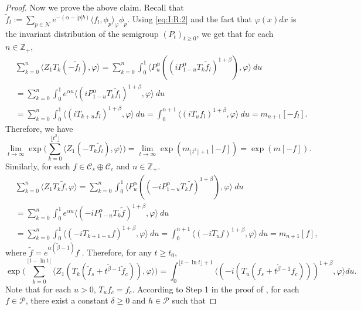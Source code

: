 \documentclass[12pt,a4paper]{amsart}
\theoremstyle{plain}
\theoremstyle{definition}
\numberwithin{equation}{section}
\begin{document}
\begin{proof}
Now we prove the above claim.
 Recall that  $\tilde f_l := \sum_{p\in \mathcal N} e^{-(\alpha - |p|b)}\langle f_l, \phi_p \rangle_\varphi \phi_p$.
  Using \eqref{eq:I:R:2} and the fact that $\varphi(x)dx$ is the invariant distribution of the semigroup $(P_t)_{t\geq 0}$, we get that for each $n\in \mathbb Z_+$,
  \begin{align}
    \label{eq:PM:CLTS:2a}
    & \sum_{k=0}^n \langle Z_1 T_{k} (-\tilde f_l), \varphi \rangle
      = \sum_{k=0}^n \int_0^1 \langle P_u^\alpha ((iP_{1 - u}^\alpha T_k \tilde f_l)^{1+\beta}), \varphi\rangle ~du
    \\& = \sum_{k=0}^n \int_0^1 e^{\alpha u} \langle  (iP_{1 - u}^\alpha T_{k}\tilde f_l)^{1+\beta}, \varphi \rangle ~du
    \\& = \sum_{k=0}^n \int_0^1 \langle  (iT_{k+ u} f_l)^{1+\beta}, \varphi\rangle~du
    = \int_0^{n+1} \langle  (iT_{u} f_l)^{1+\beta}, \varphi\rangle~du = m_{n+1}[-f_l].
  \end{align}
Therefore, we have
\[
\lim_{t\rightarrow \infty}\exp\Big(\sum_{k=0}^{\lfloor t^2 \rfloor}\langle Z_1(-T_k\tilde{f}_l),\varphi\rangle\Big) = \lim_{t\rightarrow \infty}\exp(m_{\lfloor t^2 \rfloor+1}[-f])=\exp(m[-f]).
\]
Similarly, for each $f\in \mathcal C_s  \oplus \mathcal C_c$ and $n\in \mathbb Z_+$.
  \begin{align}
    & \sum_{k=0}^n \langle Z_1 T_{k} \tilde f, \varphi \rangle
    = \sum_{k=0}^n \int_0^1 \langle P_u^\alpha ((-iP_{1 - u}^\alpha T_k \tilde f)^{1+\beta}), \varphi\rangle ~du
    \\& = \sum_{k=0}^n \int_0^1 e^{\alpha u} \langle  (-iP_{1 - u}^\alpha T_{k}\tilde f)^{1+\beta}, \varphi \rangle ~du
    \\& = \sum_{k=0}^n \int_0^1 \langle  (-iT_{k+1 - u} f)^{1+\beta}, \varphi\rangle~du
    = \int_0^{n+1} \langle  (-iT_{u} f)^{1+\beta}, \varphi\rangle~du = m_{n+1}[f],
  \end{align}
where $\tilde f=e^{\alpha(\tilde \beta - 1)} f$ .
Therefore, for any $t\geq t_0$,
\[
\exp\Big(\sum_{k=0}^{\lfloor t-\ln t \rfloor} \langle Z_1(T_{k}(\tilde f_s+t^{\tilde{\beta}-1}\tilde{f}_c)), \varphi\rangle \Big)=\int_0^{\lfloor t-\ln t \rfloor+1}\langle (-i(T_u(f_s+t^{\tilde{\beta}-1}f_c)))^{1+\beta},\varphi\rangle du.
\]
Note that for each $u>0$, $T_uf_c=f_c$. According to Step 1 in the proof
of \cite[Lemma 2.6]{RenSongSunZhao2019Stable}, for each $f\in \mathcal P$, there exist a constant $\delta\geq 0$ and $h\in \mathcal P$
 such that

\end{proof}
\end{document}
